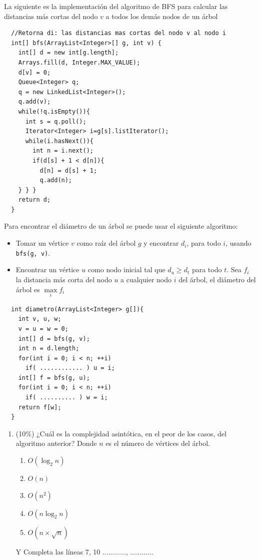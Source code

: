 \documentclass[10 pt]{article}
\begin{document}
La siguiente es la implementación del algoritmo de BFS para calcular las
  distancias más cortas del nodo $v$ a todos los demás nodos de un árbol
  {\footnotesize
  \begin{lstlisting}
  //Retorna di: las distancias mas cortas del nodo v al nodo i
  int[] bfs(ArrayList<Integer>[] g, int v) {
    int[] d = new int[g.length];
    Arrays.fill(d, Integer.MAX_VALUE);
    d[v] = 0;
    Queue<Integer> q;
    q = new LinkedList<Integer>();
    q.add(v);
    while(!q.isEmpty()){
      int s = q.poll();
      Iterator<Integer> i=g[s].listIterator();
      while(i.hasNext()){
        int n = i.next();
        if(d[s] + 1 < d[n]){
          d[n] = d[s] + 1;
          q.add(n);
    } } }
    return d;
  }
  \end{lstlisting}
  }
 {\footnotesize
  Para encontrar el diámetro de un árbol se puede usar el siguiente algoritmo:
  \begin{itemize}[noitemsep]
    \item Tomar un vértice $v$ como raíz del árbol $g$ y encontrar $d_i$, para todo $i$, usando \texttt{bfs(g, v)}.
    \item Encontrar un vértice $u$ como nodo inicial tal que $d_u \geq d_t$ para todo $t$. Sea $f_i$ la distancia más corta del nodo $u$ a cualquier nodo $i$ del árbol, el diámetro del árbol es $\max\limits_i{f_i}$
  \end{itemize}
 
  \begin{lstlisting}
  int diametro(ArrayList<Integer> g[]){
    int v, u, w;
    v = u = w = 0;
    int[] d = bfs(g, v);
    int n = d.length;
    for(int i = 0; i < n; ++i)
      if( ............ ) u = i;
    int[] f = bfs(g, u);
    for(int i = 0; i < n; ++i)
      if( .......... ) w = i;
    return f[w];
  }
  \end{lstlisting}
  }
  \begin{enumerate}[label=(\Alph*)]
    \item (10\%) ¿Cuál es la complejidad asintótica, en el peor de los casos, del algoritmo anterior? Donde $n$ es el número de vértices del árbol.
    \begin{enumerate}[label=\roman*]
      \item $O(\log_2 n)$
      \item $O(n)$
      \item $O(n^2)$
      \item $O(n \log_2 n)$
      \item $O(n \times \sqrt{n})$
    \end{enumerate}
    Y Completa las líneas 7, 10 ............, ............
  \end{enumerate}
\end{document}

